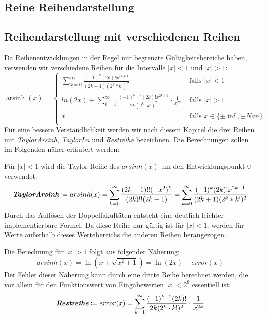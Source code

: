 \documentclass[course=erap] {aspdoc}
\begin{document}
    \subsection{Reine Reihendarstellung}
    
    \subsection{Reihendarstellung mit verschiedenen Reihen}
    Da Reihenentwicklungen in der Regel nur begrenzte Gültigkeitsbereiche haben, verwenden wir verschiedene Reihen für die Intervalle $|x| < 1$ und $|x| > 1$: 
      \[ \operatorname{arsinh}(x) =
    \begin{cases}
        \sum_{k = 0}^{\infty} \frac{(-1)^k(2k)!x^{2k + 1}}{(2k + 1)(2^k*k!)^2}     & \text{ falls } |x| < 1 \\
        ln(2x) + \sum_{k = 1}^{\infty} \frac{(-1)^{k - 1}(2k)!x^{2k + 1}}{2k(2^k\cdot k!)^2} \cdot \frac{1}{x^{2k}}  & \text{ falls } |x| >1 \\
        x     & \text{ falls } x \in \{\pm\inf, \pm Nan\}\\
    \end{cases}\]
    Für eine bessere Verständlichkeit werden wir nach diesem Kapitel die drei Reihen mit \textit{TaylorArsinh}, \textit{TaylorLn} und \textit{Restreihe} bezeichnen.
    Die Berechnungen sollen im Folgenden näher erläutert werden:
    
    Für $|x| < 1$ wird die Taylor-Reihe des $arsinh(x)$ um den Entwicklungspunkt 0 verwendet:
    \[
       \textit{\textbf{TaylorArsinh}}\coloneqq arsinh(x) = \sum_{k = 0}^{\infty} \frac{(2k-1)!!(-x^2)^k}{(2k)!!(2k + 1)}
        = \sum_{k = 0}^{\infty} \frac{(-1)^k(2k)!x^{2k + 1}}{(2k + 1)(2^k*k!)^2}
    \]
    Durch das Auflösen der Doppelfakultäten entsteht eine deutlich leichter implementierbare Formel.
    Da diese Reihe nur gültig ist für $|x| < 1$, werden für Werte außerhalb dieses Wertebereichs die anderen Reihen herangezogen.

    Die Berechnung für $|x| > 1$ folgt aus folgender Näherung:
    \[
        arsinh(x) = \ln(x + \sqrt{x^2 + 1}) = \ln(2x) + error(x)
    \]
    Der Fehler dieser Näherung kann durch eine dritte Reihe berechnet werden, die vor allem für den Funktionswert von Eingabewerten $|x| < 2^{8}$ essentiell ist:
    \[
        \textit{\textbf{Restreihe}}\coloneqq error(x) =  \sum_{k = 1}^{\infty} \frac{(-1)^{k - 1}(2k)!}{2k(2^k\cdot k!)^2} \cdot \frac{1}{x^{2k}}
    \]
    
\end{document}
